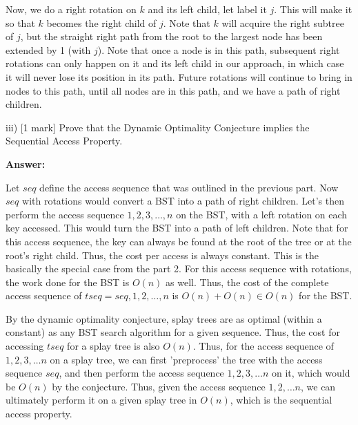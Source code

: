 \documentclass{article}
\begin{document}
Now, we do a right rotation on $k$ and its left child, let label it $j$. This will make it so that $k$ becomes the right
child of $j$. Note that $k$ will acquire the right subtree of $j$, but the straight right path from the root to the
largest node has been extended by 1 (with $j$). Note that once a node is in this path, subsequent right rotations can
only happen on it and its left child in our approach, in which case it will never lose its position in its path. Future
rotations will continue to bring in nodes to this path, until all nodes are in this path, and we have a path of right
children.

iii)  [1 mark] Prove that the Dynamic Optimality Conjecture implies the Sequential Access
Property.

\textbf{Answer:}

Let $seq$ define the access sequence that was outlined in the previous part. Now $seq$ with rotations would convert a BST
into a path of right children. Let's then perform the access sequence $1, 2, 3, \ldots, n$ on the BST, with a left
rotation on each key accessed. This would turn the BST into a path of left children. Note that for this access sequence,
the key can always be found at the root of the tree or at the root's right child. Thus, the cost per access is always
constant. This is the basically the special case from the part 2. For this access sequence with
rotations, the work done for the BST is $O(n)$ as well. Thus, the cost of the complete access sequence of $tseq = seq, 1,
2, \ldots, n$ is $O(n) + O(n) \in O(n)$ for the BST.

By the dynamic optimality conjecture, splay trees are as optimal (within a constant) as any BST search algorithm for a
given sequence. Thus, the cost for accessing $tseq$ for a splay tree is also $O(n)$. Thus, for the access sequence of
$1, 2, 3, \ldots n$ on a splay tree, we can first 'preprocess' the tree with the access sequence $seq$, and then perform
the access sequence $1, 2, 3, \ldots n$ on it, which would be $O(n)$ by the conjecture.  Thus, given the access sequence
$1, 2, \ldots n$, we can ultimately perform it on a given splay tree in $O(n)$, which is the sequential access property.
\end{document}
